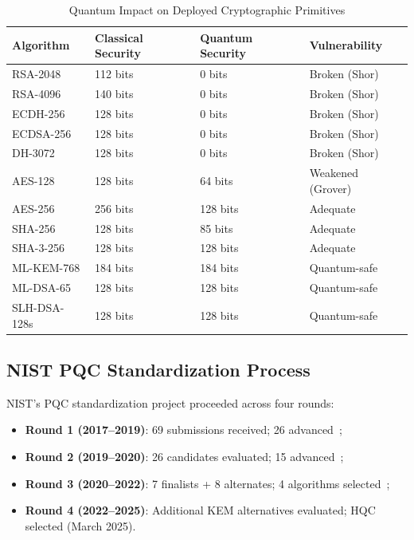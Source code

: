 \documentclass[journal]{IEEEtran}
\begin{document}
\begin{table}[t]
\caption{Quantum Impact on Deployed Cryptographic Primitives}
\label{tab:algorithm_impact}
\centering
\footnotesize
\renewcommand{\arraystretch}{1.2}
\begin{tabular}{@{}L{2.0cm}C{1.5cm}C{1.5cm}C{1.8cm}@{}}
\toprule
\textbf{Algorithm} & \textbf{Classical Security} & \textbf{Quantum Security} & \textbf{Vulnerability} \\
\midrule
RSA-2048       & 112 bits & 0 bits   & Broken (Shor) \\
RSA-4096       & 140 bits & 0 bits   & Broken (Shor) \\
ECDH-256       & 128 bits & 0 bits   & Broken (Shor) \\
ECDSA-256      & 128 bits & 0 bits   & Broken (Shor) \\
DH-3072        & 128 bits & 0 bits   & Broken (Shor) \\
AES-128        & 128 bits & 64 bits  & Weakened (Grover) \\
AES-256        & 256 bits & 128 bits & Adequate \\
SHA-256        & 128 bits & 85 bits  & Adequate \\
SHA-3-256      & 128 bits & 128 bits & Adequate \\
\midrule
ML-KEM-768     & 184 bits & 184 bits & Quantum-safe \\
ML-DSA-65      & 128 bits & 128 bits & Quantum-safe \\
SLH-DSA-128s   & 128 bits & 128 bits & Quantum-safe \\
\bottomrule
\end{tabular}
\end{table}

\subsection{NIST PQC Standardization Process}

NIST's PQC standardization project proceeded across four rounds:
\begin{itemize}
  \item \textbf{Round 1 (2017--2019)}: 69 submissions received; 26 advanced~\cite{nist2019second};
  \item \textbf{Round 2 (2019--2020)}: 26 candidates evaluated; 15 advanced~\cite{nist2020third};
  \item \textbf{Round 3 (2020--2022)}: 7 finalists + 8 alternates; 4 algorithms selected~\cite{nist2022selected};
  \item \textbf{Round 4 (2022--2025)}: Additional KEM alternatives evaluated; HQC selected (March 2025).
\end{itemize}
\end{document}
